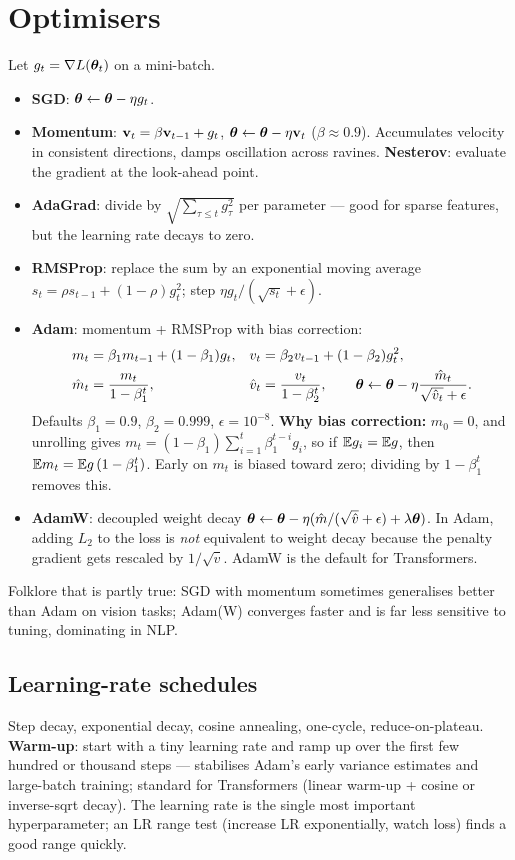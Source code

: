 \section{Optimisers}
Let $g_t=\nabla L(\bm{\theta}_t)$ on a mini-batch.
\begin{itemize}
  \item \textbf{SGD}: $\bm{\theta}\leftarrow\bm{\theta}-\eta g_t$.
  \item \textbf{Momentum}: $\mathbf{v}_t=\beta\mathbf{v}_{t-1}+g_t$, $\bm{\theta}\leftarrow\bm{\theta}-\eta\mathbf{v}_t$ ($\beta\approx0.9$). Accumulates velocity in consistent directions, damps oscillation across ravines. \textbf{Nesterov}: evaluate the gradient at the look-ahead point.
  \item \textbf{AdaGrad}: divide by $\sqrt{\sum_{\tau\le t}g_\tau^2}$ per parameter --- good for sparse features, but the learning rate decays to zero.
  \item \textbf{RMSProp}: replace the sum by an exponential moving average $s_t=\rho s_{t-1}+(1-\rho)g_t^2$; step $\eta g_t/(\sqrt{s_t}+\epsilon)$.
  \item \textbf{Adam}: momentum + RMSProp with bias correction:
  \begin{align*}
  m_t&=\beta_1m_{t-1}+(1-\beta_1)g_t, & v_t&=\beta_2v_{t-1}+(1-\beta_2)g_t^2,\\
  \hat m_t&=\frac{m_t}{1-\beta_1^t}, & \hat v_t&=\frac{v_t}{1-\beta_2^t},\qquad\bm{\theta}\leftarrow\bm{\theta}-\eta\frac{\hat m_t}{\sqrt{\hat v_t}+\epsilon}.
  \end{align*}
  Defaults $\beta_1=0.9$, $\beta_2=0.999$, $\epsilon=10^{-8}$.
  \textbf{Why bias correction:} $m_0=0$, and unrolling gives $m_t=(1-\beta_1)\sum_{i=1}^t\beta_1^{t-i}g_i$, so if $\mathbb{E} g_i=\mathbb{E} g$, then $\mathbb{E} m_t=\mathbb{E} g\,(1-\beta_1^t)$. Early on $m_t$ is biased toward zero; dividing by $1-\beta_1^t$ removes this.
  \item \textbf{AdamW}: decoupled weight decay $\bm{\theta}\leftarrow\bm{\theta}-\eta(\hat m/(\sqrt{\hat v}+\epsilon)+\lambda\bm{\theta})$. In Adam, adding $L_2$ to the loss is \emph{not} equivalent to weight decay because the penalty gradient gets rescaled by $1/\sqrt{\hat v}$. AdamW is the default for Transformers.
\end{itemize}
Folklore that is partly true: SGD with momentum sometimes generalises better than Adam on vision tasks; Adam(W) converges faster and is far less sensitive to tuning, dominating in NLP.

\subsection{Learning-rate schedules}
Step decay, exponential decay, cosine annealing, one-cycle, reduce-on-plateau. \textbf{Warm-up}: start with a tiny learning rate and ramp up over the first few hundred or thousand steps --- stabilises Adam's early variance estimates and large-batch training; standard for Transformers (linear warm-up + cosine or inverse-sqrt decay). The learning rate is the single most important hyperparameter; an LR range test (increase LR exponentially, watch loss) finds a good range quickly.

